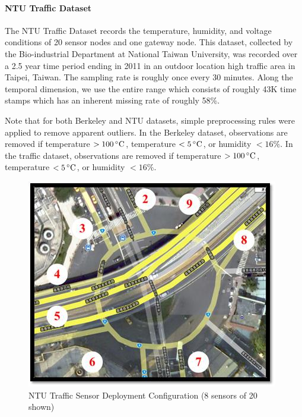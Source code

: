 \paragraph*{NTU Traffic Dataset}

The NTU Traffic Dataset records the temperature, humidity, and voltage conditions of 20 sensor nodes and one gateway node.
This dataset, collected by the Bio-industrial Department at National Taiwan University, was recorded over a 2.5 year time period ending in 2011 in an outdoor location high traffic area in Taipei, Taiwan\cite{liu2011developed}.
The sampling rate is roughly once every 30 minutes.
Along the temporal dimension, we use the entire range which consists of roughly 43K time stamps which has an inherent missing rate of roughly 58\%.

Note that for both Berkeley and NTU datasets, simple preprocessing rules were applied to remove apparent outliers.
In the Berkeley dataset, observations are removed if temperature \mbox{$>100\,^{\circ}\mathrm{C}$}, temperature \mbox{$<5\,^{\circ}\mathrm{C}$}, or humidity \mbox{$<16\%$}.
In the traffic dataset, observations are removed if temperature \mbox{$>100\,^{\circ}\mathrm{C}$}, temperature \mbox{$<5\,^{\circ}\mathrm{C}$}, or humidity \mbox{$<16\%$}.
\begin{figure}[H]
\centering
\includegraphics[scale=0.3]{traffic_wsn.png}
\caption{NTU Traffic Sensor Deployment Configuration (8 sensors of 20 shown)}
\end{figure}


